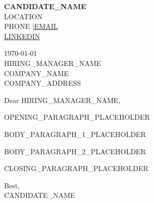 \documentclass[11pt,letterpaper]{article}
\begin{document}
\begin{flushleft}
{\large\bfseries CANDIDATE\_NAME} \\[2pt]
LOCATION \\
PHONE \enspace|\enspace \href{mailto:EMAIL}{EMAIL} \\
\href{https://LINKEDIN}{LINKEDIN}
\end{flushleft}

\vspace{0.5em}

\begin{flushleft}
\today \\[0.5em]
HIRING\_MANAGER\_NAME \\
COMPANY\_NAME \\
COMPANY\_ADDRESS
\end{flushleft}

\vspace{0.5em}

Dear HIRING\_MANAGER\_NAME,

OPENING\_PARAGRAPH\_PLACEHOLDER

BODY\_PARAGRAPH\_1\_PLACEHOLDER

BODY\_PARAGRAPH\_2\_PLACEHOLDER

CLOSING\_PARAGRAPH\_PLACEHOLDER

Best, \\[1.5em]
CANDIDATE\_NAME
\end{document}
